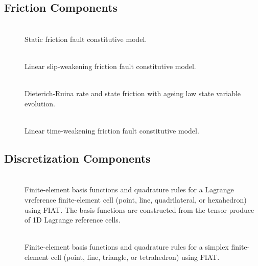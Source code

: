 \subsection{Friction Components}
\begin{description}
\item [] \\
Static friction fault constitutive model.
\item [] \\
Linear slip-weakening friction fault constitutive model.
\item [] \\
Dieterich-Ruina rate and state friction with ageing law state variable
evolution.
\item [] \\
Linear time-weakening friction fault constitutive model.
\end{description}

\subsection{Discretization Components}
\begin{description}
\item [] \\
Finite-element basis functions and quadrature rules for a Lagrange
vreference finite-element cell (point, line, quadrilateral, or hexahedron)
using FIAT. The basis functions are constructed from the tensor produce
of 1D Lagrange reference cells.
\item [] \\
Finite-element basis functions and quadrature rules for a simplex
finite-element cell (point, line, triangle, or tetrahedron) using
FIAT.
\end{description}

